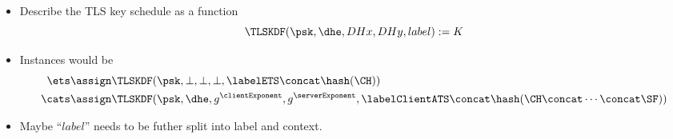 
\begin{itemize}
	\item Describe the TLS key schedule as a function
	\[
		\TLSKDF(\psk, \dhe, DHx, DHy, label) := K
	\]
	
	\item Instances would be
	\begin{align*}
		\ets \assign &\TLSKDF(\psk, \bot, \bot, \bot, \labelETS \concat \hash(\CH))\\
		\cats \assign &\TLSKDF(\psk, \dhe, g^\clientExponent, g^\serverExponent, \labelClientATS \concat \hash(\CH \concat \dotsb \concat \SF))\\
	\end{align*}
	
	\item Maybe ``$label$'' needs to be futher split into label and context.
\end{itemize}


